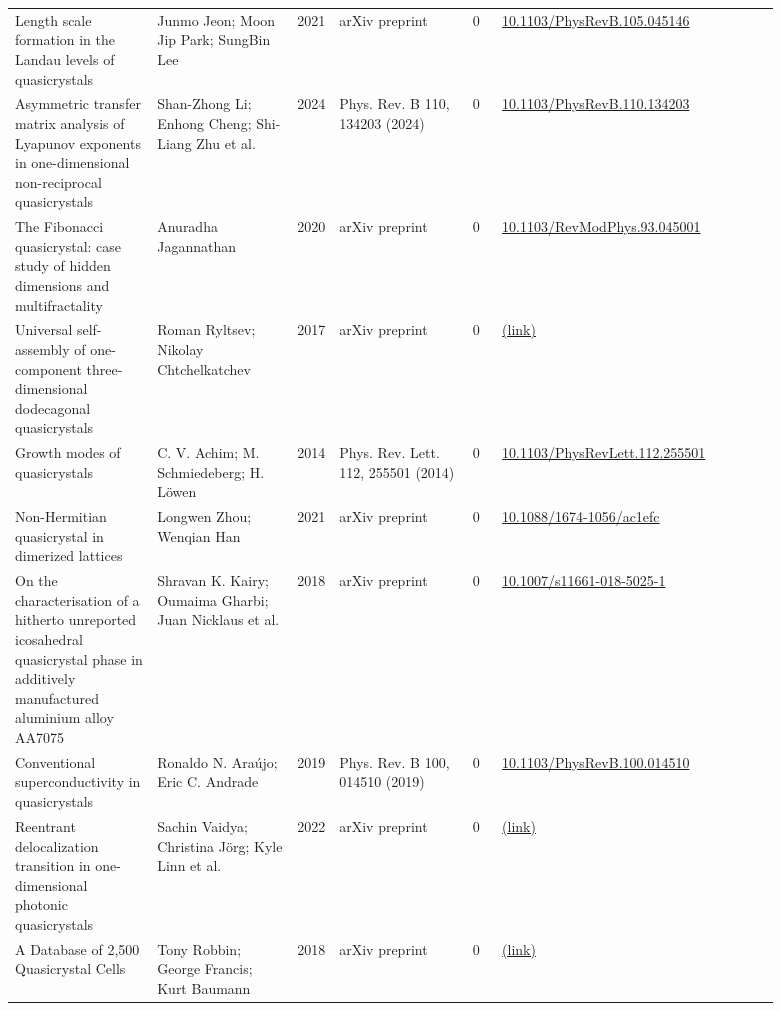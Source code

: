 \documentclass[10pt,a4paper]{article}
\begin{document}
{\begin{longtable}{p{0.192\linewidth}p{0.192\linewidth}p{0.043\linewidth}p{0.192\linewidth}p{0.043\linewidth}p{0.132\linewidth}p{0.096\linewidth}}
Length scale formation in the Landau levels of quasicrystals & Junmo Jeon; Moon Jip Park; SungBin Lee & 2021 & arXiv preprint & 0 & \href{https://doi.org/10.1103/PhysRevB.105.045146}{10.1103/PhysRevB.105.045146} &  \\
Asymmetric transfer matrix analysis of Lyapunov exponents in one-dimensional non-reciprocal quasicrystals & Shan-Zhong Li; Enhong Cheng; Shi-Liang Zhu et al. & 2024 & Phys. Rev. B 110, 134203 (2024) & 0 & \href{https://doi.org/10.1103/PhysRevB.110.134203}{10.1103/PhysRevB.110.134203} &  \\
The Fibonacci quasicrystal: case study of hidden dimensions and multifractality & Anuradha Jagannathan & 2020 & arXiv preprint & 0 & \href{https://doi.org/10.1103/RevModPhys.93.045001}{10.1103/RevModPhys.93.045001} &  \\
Universal self-assembly of one-component three-dimensional dodecagonal quasicrystals & Roman Ryltsev; Nikolay Chtchelkatchev & 2017 & arXiv preprint & 0 & \href{http://arxiv.org/abs/1705.01517v1}{(link)} &  \\
Growth modes of quasicrystals & C. V. Achim; M. Schmiedeberg; H. Löwen & 2014 & Phys. Rev. Lett. 112, 255501 (2014) & 0 & \href{https://doi.org/10.1103/PhysRevLett.112.255501}{10.1103/PhysRevLett.112.255501} &  \\
Non-Hermitian quasicrystal in dimerized lattices & Longwen Zhou; Wenqian Han & 2021 & arXiv preprint & 0 & \href{https://doi.org/10.1088/1674-1056/ac1efc}{10.1088/1674-1056/ac1efc} &  \\
On the characterisation of a hitherto unreported icosahedral quasicrystal phase in additively manufactured aluminium alloy AA7075 & Shravan K. Kairy; Oumaima Gharbi; Juan Nicklaus et al. & 2018 & arXiv preprint & 0 & \href{https://doi.org/10.1007/s11661-018-5025-1}{10.1007/s11661-018-5025-1} &  \\
Conventional superconductivity in quasicrystals & Ronaldo N. Araújo; Eric C. Andrade & 2019 & Phys. Rev. B 100, 014510 (2019) & 0 & \href{https://doi.org/10.1103/PhysRevB.100.014510}{10.1103/PhysRevB.100.014510} &  \\
Reentrant delocalization transition in one-dimensional photonic quasicrystals & Sachin Vaidya; Christina Jörg; Kyle Linn et al. & 2022 & arXiv preprint & 0 & \href{http://arxiv.org/abs/2211.06047v1}{(link)} &  \\
A Database of 2,500 Quasicrystal Cells & Tony Robbin; George Francis; Kurt Baumann & 2018 & arXiv preprint & 0 & \href{http://arxiv.org/abs/1805.11457v2}{(link)} &  \\

\end{longtable}}
\end{document}
